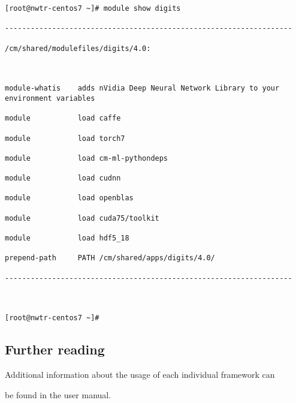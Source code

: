 \documentclass[]{article}
\begin{document}
\begin{verbatim}



[root@nwtr-centos7 ~]# module show digits

-------------------------------------------------------------------

/cm/shared/modulefiles/digits/4.0:



module-whatis    adds nVidia Deep Neural Network Library to your environment variables

module           load caffe

module           load torch7

module           load cm-ml-pythondeps

module           load cudnn

module           load openblas

module           load cuda75/toolkit

module           load hdf5_18

prepend-path     PATH /cm/shared/apps/digits/4.0/

-------------------------------------------------------------------



[root@nwtr-centos7 ~]#

\end{verbatim}



\subsection{Further reading}\label{further-reading}



Additional information about the usage of each individual framework can

be found in the user manual.
\end{document}
